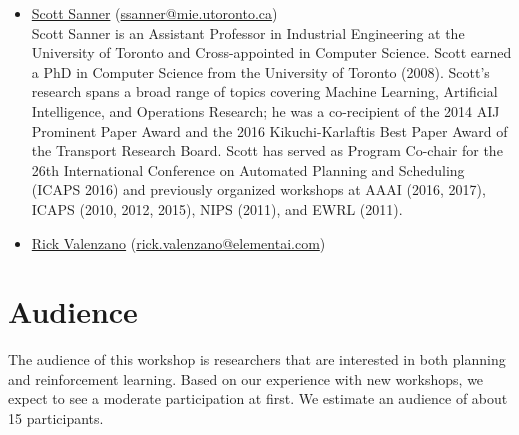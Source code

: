\documentclass[10pt]{article}
\begin{document}
\begin{itemize}
\item \href{http://d3m.mie.utoronto.ca}{Scott Sanner}
  (\href{mailto:ssanner@mie.utoronto.ca}{ssanner@mie.utoronto.ca})\\
Scott Sanner is an Assistant Professor in Industrial Engineering at the
University of Toronto and Cross-appointed in Computer Science.  Scott earned a
PhD in Computer Science from the University of Toronto (2008).  Scott’s research
spans a broad range of topics covering Machine Learning, Artificial
Intelligence, and Operations Research; he was a co-recipient of the 2014 AIJ
Prominent Paper Award and the 2016 Kikuchi-Karlaftis Best Paper Award of the
Transport Research Board.  Scott has served as Program Co-chair for the 26th
International Conference on Automated Planning and Scheduling (ICAPS 2016) and
previously organized workshops at AAAI (2016, 2017), ICAPS (2010, 2012, 2015),
NIPS (2011), and EWRL (2011).
  
\item \href{https://sites.google.com/a/ualberta.ca/rickvalenzano/}{Rick Valenzano}
  (\href{mailto:rick.valenzano@elementai.com}{rick.valenzano@elementai.com})\\



  
\end{itemize}

\section*{Audience}

The audience of this workshop is researchers that are interested in both
planning and reinforcement learning.
%
Based on our experience with new workshops, we expect to see a moderate
participation at first. We estimate an audience of about 15 participants.  
\end{document}
